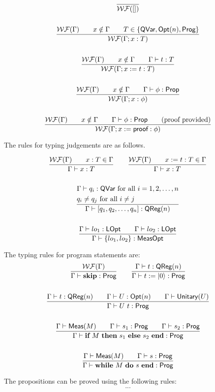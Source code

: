 \begin{gather*}
    \frac{}{\mathcal{WF}([])} \\
    \\
    \frac{\mathcal{WF}(\Gamma) \qquad x \notin \Gamma \qquad T \in \{\textsf{QVar}, \textsf{Opt}(n), \textsf{Prog} \}}{\mathcal{WF}(\Gamma;x:T)} \\
    \\
    \frac{\mathcal{WF}(\Gamma) \qquad x \notin \Gamma \qquad \Gamma \vdash t : T}{\mathcal{WF}(\Gamma;x := t : T)} \\
    \\
    \frac{\mathcal{WF}(\Gamma) \qquad x \notin \Gamma \qquad \Gamma \vdash \phi : \textsf{Prop}}{\mathcal{WF}(\Gamma;x:\phi)} \\
    \\
    \frac{\mathcal{WF}(\Gamma) \qquad x \notin \Gamma \qquad \Gamma \vdash \phi : \textsf{Prop} \qquad \text{(proof provided)}}{\mathcal{WF}(\Gamma;x:=\textsf{proof}:\phi)} \\
\end{gather*}

The rules for typing judgements are as follows.

\begin{gather*}
    \frac{\mathcal{WF}(\Gamma) \qquad x : T \in \Gamma}{\Gamma \vdash x : T}
    \qquad
    \frac{\mathcal{WF}(\Gamma) \qquad x := t : T \in \Gamma}{\Gamma \vdash x : T} \\
    \\
    \frac{
        \begin{aligned}
            & \Gamma \vdash q_i : \textsf{QVar} \text{ for all } i = 1, 2, \dots, n\\
            & q_i \neq q_j \text{ for all } i \neq j
        \end{aligned}}{\Gamma \vdash [q_1, q_2, \dots, q_n] : \textsf{QReg}(n)} \\
    \\
    \frac{\Gamma \vdash lo_1 : \textsf{LOpt} \qquad \Gamma \vdash lo_2 : \textsf{LOpt}}{\Gamma \vdash \{lo_1, lo_2\} : \textsf{MeasOpt}}
\end{gather*}

The typing rules for program statements are:
\begin{gather*}
    \frac{\mathcal{WF}(\Gamma)}{\Gamma \vdash \textbf{skip} : \textsf{Prog}}
    \qquad
    \frac{\Gamma \vdash t : \textsf{QReg}(n)}{\Gamma \vdash t:=\ket{0} : \textsf{Prog}} \\
    \\
    \frac{\Gamma \vdash t : \textsf{QReg}(n) \qquad \Gamma \vdash U : \textsf{Opt}(n) \qquad \Gamma \vdash \textsf{Unitary}({U})}{\Gamma \vdash U\ t : \textsf{Prog}} \\
    \\
    \frac{\Gamma \vdash \textsf{Meas}(M) \qquad \Gamma \vdash s_1 : \textsf{Prog} \qquad \Gamma \vdash s_2 : \textsf{Prog}}
    {\Gamma \vdash  \textbf{if}\ M\ \textbf{then}\ s_1\ \textbf{else}\ s_2\ \textbf{end}  : \textsf{Prog}} \\
    \\
    \frac{\Gamma \vdash \textsf{Meas}(M) \qquad \Gamma \vdash s : \textsf{Prog}}
    {\Gamma \vdash  \textbf{while}\ M\ \textbf{do}\ s\ \textbf{end}  : \textsf{Prog}}
\end{gather*}


The propositions can be proved using the following rules:
\begin{gather*}
    ...
\end{gather*}